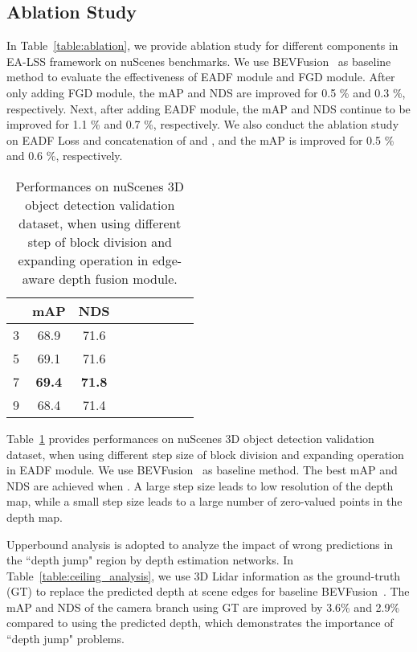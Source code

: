\documentclass[letterpaper]{article} \usepackage[submission]{aaai24}  \usepackage{times}  \usepackage{helvet}  \usepackage{courier}  \usepackage[hyphens]{url}  \usepackage{graphicx} \urlstyle{rm} \def\UrlFont{\rm}  \usepackage{natbib}  \usepackage{caption} \frenchspacing  \setlength{\pdfpagewidth}{8.5in} \setlength{\pdfpageheight}{11in} \usepackage{algorithm}
\begin{document}
\subsection{Ablation Study}



In Table~\ref{table:ablation}, we provide ablation study for different components in EA-LSS framework on nuScenes benchmarks. We use BEVFusion~\cite{liang2022bevfusion} as baseline method to evaluate the effectiveness of EADF module and FGD module.
After only adding FGD module, the mAP and NDS are improved for 0.5 \% and 0.3 \%, respectively. Next, after adding EADF module, the mAP and NDS continue to be improved for 1.1 \% and 0.7 \%, respectively.  We also conduct the ablation study on EADF Loss and concatenation of   and , and the mAP is improved for 0.5 \% and 0.6 \%, respectively.   


\begin{table}
\begin{center}
\begin{tabular}{c|c|ccccccc}
\hline
 &	mAP & NDS \\
\hline
3 &	68.9 &	71.6 \\
5 &	69.1 &	71.6  \\
7 &	\textbf{69.4} &	\textbf{71.8} \\
9 & 68.4 & 71.4 \\						
\hline
\end{tabular}
\end{center}
\caption{Performances on nuScenes 3D object detection validation dataset, when using different step  of block division and expanding operation in edge-aware depth fusion module.}
\label{table:k}
\end{table}

Table~\ref{table:k} provides performances on nuScenes 3D object detection validation dataset, when using different step size  of block division and expanding operation in EADF module. We use BEVFusion~\cite{liu2022bevfusion} as baseline method. The best mAP and NDS are achieved when . 
A large step size leads to low resolution of the depth map, while a small step size leads to a large number of zero-valued points in the depth map.

Upperbound analysis is adopted to analyze the impact of wrong predictions in the ``depth jump" region by depth estimation networks. In Table~\ref{table:ceiling_analysis}, we use 3D Lidar information as the ground-truth (GT) to replace the predicted depth at scene edges for baseline BEVFusion~\cite{liu2022bevfusion}. The mAP and NDS of the camera branch using GT are improved by 3.6\% and 2.9\% compared to using the predicted depth, which demonstrates the importance of ``depth jump" problems.
\end{document}
